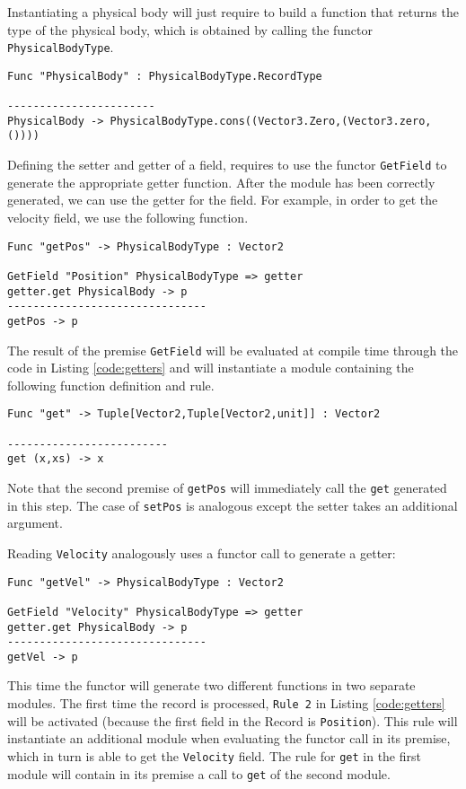 Instantiating a physical body will just require to build a function that returns the type of the physical body, which is obtained by calling the functor \texttt{PhysicalBodyType}.

\begin{lstlisting}
Func "PhysicalBody" : PhysicalBodyType.RecordType

-----------------------
PhysicalBody -> PhysicalBodyType.cons((Vector3.Zero,(Vector3.zero,())))
\end{lstlisting}

Defining the setter and getter of a field, requires to use the functor \texttt{GetField} to generate the appropriate getter function. After the module has been correctly generated, we can use the getter for the field. For example, in order to get the velocity field, we use the following function.

\begin{lstlisting}
Func "getPos" -> PhysicalBodyType : Vector2

GetField "Position" PhysicalBodyType => getter
getter.get PhysicalBody -> p
-------------------------------
getPos -> p
\end{lstlisting}

The result of the premise \texttt{GetField} will be evaluated at compile time through the code in Listing \ref{code:getters} and will instantiate a module containing the following function definition and rule.

\begin{lstlisting}
Func "get" -> Tuple[Vector2,Tuple[Vector2,unit]] : Vector2

-------------------------
get (x,xs) -> x
\end{lstlisting}

\noindent
Note that the second premise of \texttt{getPos} will immediately call the \texttt{get} generated in this step. The case of \texttt{setPos} is analogous except the setter takes an additional argument.

Reading \texttt{Velocity} analogously uses a functor call to generate a getter:

\begin{lstlisting}
Func "getVel" -> PhysicalBodyType : Vector2

GetField "Velocity" PhysicalBodyType => getter
getter.get PhysicalBody -> p
-------------------------------
getVel -> p
\end{lstlisting}

\noindent
This time the functor will generate two different functions in two separate modules. The first time the record is processed, \texttt{Rule 2} in Listing \ref{code:getters} will be activated (because the first field in the Record is \texttt{Position}). This rule will instantiate an additional module when evaluating the functor call in its premise, which in turn is able to get the \texttt{Velocity} field. The rule for \texttt{get} in the first module will contain in its premise a call to  \texttt{get} of the second module.

